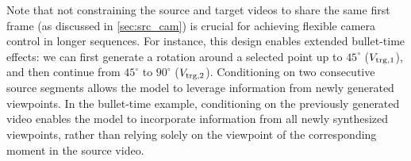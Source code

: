 Note that not constraining the source and target videos to share the same first frame (as discussed in \cref{sec:src_cam}) is crucial for achieving flexible camera control in longer sequences.
For instance, this design enables extended bullet-time effects: we can first generate a rotation around a selected point up to $45^\circ$ ($V_{\text{trg},1}$), and then continue from $45^\circ$ to $90^\circ$ ($V_{\text{trg},2}$).
Conditioning on two consecutive source segments allows the model to leverage information from newly generated viewpoints.
In the bullet-time example, conditioning on the previously generated video enables the model to incorporate information from all newly synthesized viewpoints, rather than relying solely on the viewpoint of the corresponding moment in the source video.




